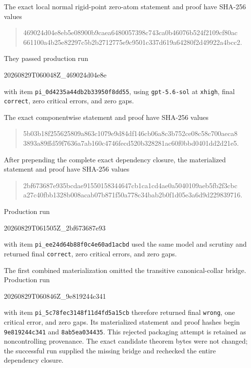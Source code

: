 The exact local normal rigid-point zero-atom statement and proof have
SHA-256 values
\begin{quote}
\small\ttfamily
469024d04e8eb5e08900b9caea6480057398c743ca0b46076b524f2109cf80ac\\
661100a4b25e82297c5b2b2712775e9c9501c337d619a64280f2d49922a4bcc2.
\end{quote}
They passed production run
\begin{center}
\small\ttfamily 20260829T060048Z\_469024d04e8e
\end{center}
with item \texttt{pi\_0d4235a44db2b33950f8dd55}, using
\texttt{gpt-5.6-sol} at \texttt{xhigh}, final \texttt{correct}, zero
critical errors, and zero gaps.

The exact componentwise statement and proof have SHA-256 values
\begin{quote}
\small\ttfamily
5b03b18f255625809a863c1079e9d84df146cb06a8c3b752ce08c58c700aeca8\\
3893a89ffd59f7636a7ab160c4746fecd520b328281ac60f0bbd0401dd2d21e5.
\end{quote}
After prepending the complete exact dependency closure, the materialized
statement and proof have SHA-256 values
\begin{quote}
\small\ttfamily
2bf673687e935bcdae91550158344647cb1ca1cd4ae0a5040109aeb5fb2f3cbc\\
a27c40fbb1328b008acab07b871f50a778c34bab2b0f1d05e3a6d9d229839716.
\end{quote}
Production run
\begin{center}
\small\ttfamily 20260829T061505Z\_2bf673687e93
\end{center}
with item \texttt{pi\_ee24d64b88f0c4e60ad1acbd} used the same model and
scrutiny and returned final \texttt{correct}, zero critical errors, and zero
gaps.

The first combined materialization omitted the transitive canonical-collar
bridge.  Production run
\begin{center}
\small\ttfamily 20260829T060846Z\_9e819244c341
\end{center}
with item \texttt{pi\_5c78fec3148f11d4fd5a15cb} therefore returned final
\texttt{wrong}, one critical error, and zero gaps.  Its materialized
statement and proof hashes begin \texttt{9e819244c341} and
\texttt{8ab5ea034435}.  This rejected packaging attempt is retained as
noncontrolling provenance.  The exact candidate theorem bytes were not
changed; the successful run supplied the missing bridge and rechecked the
entire dependency closure.

